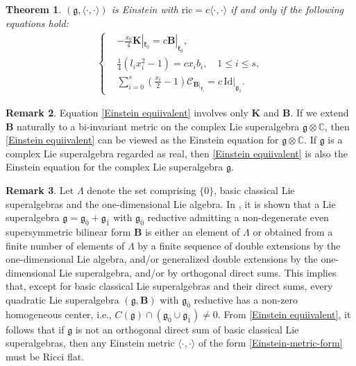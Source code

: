 \documentclass[reqno]{amsart}
\newtheorem{thm}{Theorem}[section]
\theoremstyle{definition}
\newtheorem{rem}[thm]{Remark}
\begin{document}
\begin{thm}\label{3-thm-main}
$(\mathfrak{g},\langle\cdot,\cdot\rangle)$ is Einstein with $\mathrm{ric}=c\langle\cdot,\cdot\rangle$ if and only if the following equations hold:
\begin{eqnarray}\label{Einstein equiivalent}
\left\{
\begin{aligned}
&-\frac{x_{0}}{4}\mathbf{K}|_{\mathfrak{k}_{0}}=c\mathbf{B}|_{\mathfrak{k}_{0}},  \\
&\frac{1}{4}(l_{i}x_{i}^{2}-1)=c x_{i}b_{i},            \quad 1\leq i\leq s,\\
&\sum\limits_{i=0}^{s}\left(\frac{x_{i}}{2}-1\right)\mathcal{C}_{\mathbf{B}|_{\mathfrak{k}_{i}}}=c\, \mathrm{Id}|_{\mathfrak{g}_{\bar{1}}}.
\end{aligned}\right.
\end{eqnarray}
\end{thm}
\begin{rem}
Equation \eqref{Einstein equiivalent}  involves only $\mathbf{K}$ and $\mathbf{B}$. If we extend $\mathbf{B}$ naturally to a bi-invariant metric on the complex Lie superalgebra $\mathfrak{g}\otimes \mathbb{C}$, then \eqref{Einstein equiivalent} can be viewed as the Einstein equation for $\mathfrak{g}\otimes \mathbb{C}$.
If $\mathfrak{g}$  is a complex Lie superalgebra regarded as  real, then
 \eqref{Einstein equiivalent} is also  the Einstein equation for the complex  Lie superalgebra $\mathfrak{g}$.
\end{rem}
\begin{rem}
 Let $\Lambda$  denote the set comprising $\{0\}$, basic classical Lie
superalgebras and the one-dimensional Lie algebra. In \cite{ABB09,Benayadi00}, it is shown that
a Lie superalgebra $\mathfrak{g}=\mathfrak{g}_{\bar{0}}+\mathfrak{g}_{\bar{1}}$ with $\mathfrak{g}_{\bar{0}}$ reductive  admitting a non-degenerate even supersymmetric bilinear form $\mathbf{B}$ is either an
element of $\Lambda$ or obtained from a finite number of elements of $\Lambda$ by a finite sequence of double extensions by the one-dimensional Lie algebra, and/or generalized double extensions by the one-dimensional Lie superalgebra, and/or by orthogonal direct sums.
This implies that, except for basic classical Lie superalgebras and their direct sums, every quadratic Lie superalgebra $(\mathfrak{g},\mathbf{B})$ with $\mathfrak{g}_{\bar{0}}$ reductive has a non-zero homogeneous center,
i.e., $C(\mathfrak{g})\cap (\mathfrak{g}_{\bar{0}}\cup \mathfrak{g}_{\bar{1}})\neq 0$.
From  \eqref{Einstein equiivalent},  it follows that if $\mathfrak{g}$ is not an orthogonal direct
sum of  basic classical Lie superalgebras, then any Einstein metric $\langle\cdot,\cdot\rangle$ of the form \eqref{Einstein-metric-form} must be Ricci flat.
\end{rem}
\end{document}
